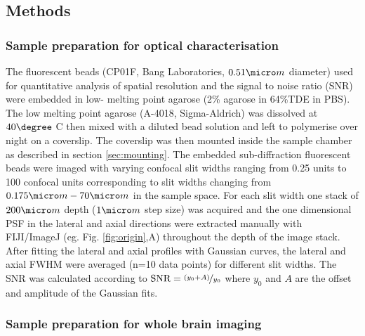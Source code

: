 \documentclass[12pt]{spieman}  %
\begin{document}
\subsection{Methods}

\subsubsection{Sample preparation for optical characterisation}
The fluorescent beads (CP01F, Bang Laboratories, $0.51 \micro m$ diameter) used for quantitative analysis of spatial resolution and the signal to noise ratio (SNR) were embedded in low- melting point agarose (2\% agarose in 64\%TDE in PBS). The low melting point agarose (A-4018, Sigma-Aldrich) was dissolved at $40 \degree$ C then mixed with a diluted bead solution and left to polymerise over night on a coverslip. The coverslip was then mounted inside the sample chamber as described in section \ref{sec:mounting}. The embedded sub-diffraction fluorescent beads were imaged with varying confocal slit widths ranging from 0.25 units to 100 confocal units corresponding to slit widths changing from $0.175 \micro m-70 \micro m$ in the sample space. For each slit width one stack of $200\micro m$ depth ($1 \micro m$ step size) was acquired and the one dimensional PSF in the lateral and axial directions were extracted manually with FIJI/ImageJ (eg. Fig. \ref{fig:origin},A) throughout the depth of the image stack. After fitting the lateral and axial profiles with Gaussian curves, the lateral and axial FWHM were averaged (n=10 data points) for different slit widths. The SNR was calculated according to $\text{SNR} = \nicefrac{(y_0 + A)}{y_0}$ where $y_0$ and $A$ are the offset and amplitude of the Gaussian fits.

\subsubsection{Sample preparation for whole brain imaging}
\end{document}

